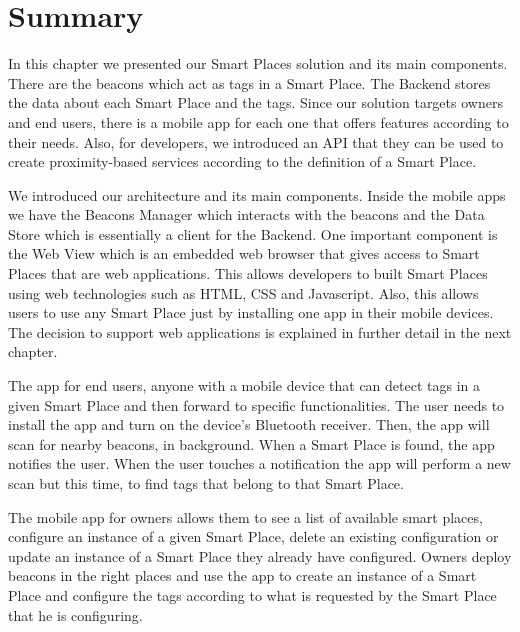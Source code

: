 \section{Summary}
\label{sec:solution_summary}
In this chapter we presented our Smart Places solution and its main components.
There are the beacons which act as tags in a Smart Place.
The Backend stores the data about each Smart Place and the tags.
Since our solution targets owners and end users, there is a mobile app for each one that offers features according to their needs.
Also, for developers, we introduced an \gls{API} that they can be used to create proximity-based services according to the definition of a Smart Place.

We introduced our architecture and its main components.
Inside the mobile apps we have the Beacons Manager which interacts with the beacons and the Data Store which is essentially a client for the Backend.
One important component is the Web View which is an embedded web browser that gives access to Smart Places that are web applications.
This allows developers to built Smart Places using web technologies such as \gls{HTML}, \gls{CSS} and Javascript.
Also, this allows users to use any Smart Place just by installing one app in their mobile devices.
The decision to support web applications is explained in further detail in the next chapter.

The app for end users, anyone with a mobile device that can detect tags in a given Smart Place and then forward to specific functionalities.
The user needs to install the app and turn on the device's Bluetooth receiver.
Then, the app will scan for nearby beacons, in background.
When a Smart Place is found, the app notifies the user.
When the user touches a notification the app will perform a new scan but this time, to find tags that belong to that Smart Place.

The mobile app for owners allows them to see a list of available smart places, configure an instance of a given Smart Place, delete an existing configuration or update an instance of a Smart Place they already have configured.
Owners deploy beacons in the right places and use the app to create an instance of a Smart Place and configure the tags according to what is requested by the Smart Place that he is configuring.

